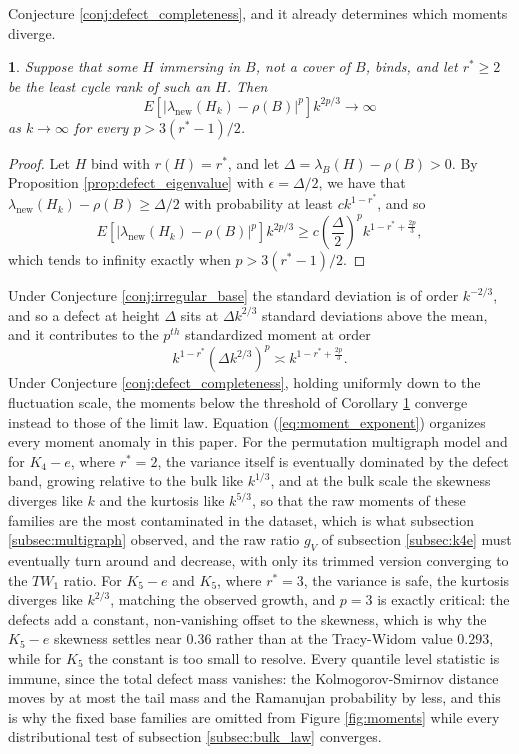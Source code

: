 \documentclass[12pt,oneside,english]{amsart}
\numberwithin{equation}{section}
\numberwithin{figure}{section}
\numberwithin{table}{section}
\theoremstyle{plain}
\numberwithin{thm}{section}
\theoremstyle{plain}
\theoremstyle{plain}
\newtheorem{cor}[thm]{\protect\corollaryname}
\theoremstyle{plain}
\theoremstyle{definition}
\theoremstyle{definition}
\theoremstyle{definition}
\theoremstyle{remark}
\providecommand{\corollaryname}{Corollary}
\begin{document}
Conjecture \ref{conj:defect_completeness}, and it already determines
which moments diverge.
\begin{cor}
\label{cor:moment_divergence}Suppose that some $H$ immersing in $B$,
not a cover of $B$, binds, and let $r^{*}\geq2$ be the least cycle
rank of such an $H$. Then
\[
E\left[\left|\lambda_{\mathrm{new}}(H_{k})-\rho(B)\right|^{p}\right]k^{2p/3}\rightarrow\infty
\]
as $k\rightarrow\infty$ for every $p>3\left(r^{*}-1\right)/2$.
\end{cor}
\begin{proof}
Let $H$ bind with $r(H)=r^{*}$, and let $\Delta=\lambda_{B}(H)-\rho(B)>0$.
By Proposition \ref{prop:defect_eigenvalue} with $\epsilon=\Delta/2$,
we have that $\lambda_{\mathrm{new}}(H_{k})-\rho(B)\geq\Delta/2$
with probability at least $ck^{1-r^{*}}$, and so
\[
E\left[\left|\lambda_{\mathrm{new}}(H_{k})-\rho(B)\right|^{p}\right]k^{2p/3}\geq c\left(\frac{\Delta}{2}\right)^{p}k^{1-r^{*}+\frac{2p}{3}},
\]
which tends to infinity exactly when $p>3\left(r^{*}-1\right)/2$.
\end{proof}
Under Conjecture \ref{conj:irregular_base} the standard deviation
is of order $k^{-2/3}$, and so a defect at height $\Delta$ sits at
$\Delta k^{2/3}$ standard deviations above the mean, and it contributes
to the $p^{th}$ standardized moment at order
\begin{equation}
k^{1-r^{*}}\left(\Delta k^{2/3}\right)^{p}\asymp k^{1-r^{*}+\frac{2p}{3}}.\label{eq:moment_exponent}
\end{equation}
Under Conjecture \ref{conj:defect_completeness}, holding uniformly
down to the fluctuation scale, the moments below the threshold of
Corollary \ref{cor:moment_divergence} converge instead to those of
the limit law. Equation (\ref{eq:moment_exponent}) organizes every
moment anomaly in this paper. For the permutation multigraph model
and for $K_{4}-e$, where $r^{*}=2$, the variance itself is eventually
dominated by the defect band, growing relative to the bulk like $k^{1/3}$,
and at the bulk scale the skewness diverges like $k$ and the kurtosis
like $k^{5/3}$, so that the raw moments of these families are the
most contaminated in the dataset, which is what subsection \ref{subsec:multigraph}
observed, and the raw ratio $g_{V}$ of subsection \ref{subsec:k4e}
must eventually turn around and decrease, with only its trimmed version
converging to the $TW_{1}$ ratio. For $K_{5}-e$ and $K_{5}$, where
$r^{*}=3$, the variance is safe, the kurtosis diverges like $k^{2/3}$,
matching the observed growth, and $p=3$ is exactly critical: the
defects add a constant, non-vanishing offset to the skewness, which
is why the $K_{5}-e$ skewness settles near $0.36$ rather than at
the Tracy-Widom value $0.293$, while for $K_{5}$ the constant is
too small to resolve. Every quantile level statistic is immune, since
the total defect mass vanishes: the Kolmogorov-Smirnov distance moves
by at most the tail mass and the Ramanujan probability by less, and
this is why the fixed base families are omitted from Figure \ref{fig:moments}
while every distributional test of subsection \ref{subsec:bulk_law}
converges.
\end{document}
